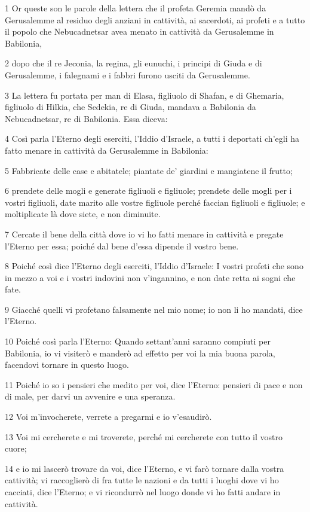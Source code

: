 \par 1 Or queste son le parole della lettera che il profeta Geremia mandò da Gerusalemme al residuo degli anziani in cattività, ai sacerdoti, ai profeti e a tutto il popolo che Nebucadnetsar avea menato in cattività da Gerusalemme in Babilonia,
\par 2 dopo che il re Jeconia, la regina, gli eunuchi, i principi di Giuda e di Gerusalemme, i falegnami e i fabbri furono usciti da Gerusalemme.
\par 3 La lettera fu portata per man di Elasa, figliuolo di Shafan, e di Ghemaria, figliuolo di Hilkia, che Sedekia, re di Giuda, mandava a Babilonia da Nebucadnetsar, re di Babilonia. Essa diceva:
\par 4 Così parla l'Eterno degli eserciti, l'Iddio d'Israele, a tutti i deportati ch'egli ha fatto menare in cattività da Gerusalemme in Babilonia:
\par 5 Fabbricate delle case e abitatele; piantate de' giardini e mangiatene il frutto;
\par 6 prendete delle mogli e generate figliuoli e figliuole; prendete delle mogli per i vostri figliuoli, date marito alle vostre figliuole perché faccian figliuoli e figliuole; e moltiplicate là dove siete, e non diminuite.
\par 7 Cercate il bene della città dove io vi ho fatti menare in cattività e pregate l'Eterno per essa; poiché dal bene d'essa dipende il vostro bene.
\par 8 Poiché così dice l'Eterno degli eserciti, l'Iddio d'Israele: I vostri profeti che sono in mezzo a voi e i vostri indovini non v'ingannino, e non date retta ai sogni che fate.
\par 9 Giacché quelli vi profetano falsamente nel mio nome; io non li ho mandati, dice l'Eterno.
\par 10 Poiché così parla l'Eterno: Quando settant'anni saranno compiuti per Babilonia, io vi visiterò e manderò ad effetto per voi la mia buona parola, facendovi tornare in questo luogo.
\par 11 Poiché io so i pensieri che medito per voi, dice l'Eterno: pensieri di pace e non di male, per darvi un avvenire e una speranza.
\par 12 Voi m'invocherete, verrete a pregarmi e io v'esaudirò.
\par 13 Voi mi cercherete e mi troverete, perché mi cercherete con tutto il vostro cuore;
\par 14 e io mi lascerò trovare da voi, dice l'Eterno, e vi farò tornare dalla vostra cattività; vi raccoglierò di fra tutte le nazioni e da tutti i luoghi dove vi ho cacciati, dice l'Eterno; e vi ricondurrò nel luogo donde vi ho fatti andare in cattività.
